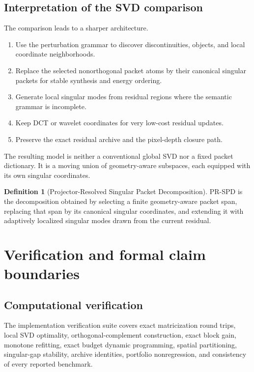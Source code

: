 \documentclass[11pt]{article}
\theoremstyle{definition}
\newtheorem{definition}[theorem]{Definition}
\theoremstyle{remark}
\begin{document}
\subsection{Interpretation of the SVD comparison}
The comparison leads to a sharper architecture.

\begin{enumerate}
\item Use the perturbation grammar to discover discontinuities, objects, and local coordinate neighborhoods.
\item Replace the selected nonorthogonal packet atoms by their canonical singular packets for stable synthesis and energy ordering.
\item Generate local singular modes from residual regions where the semantic grammar is incomplete.
\item Keep DCT or wavelet coordinates for very low-cost residual updates.
\item Preserve the exact residual archive and the pixel-depth closure path.
\end{enumerate}

The resulting model is neither a conventional global SVD nor a fixed packet dictionary. It is a moving union of geometry-aware subspaces, each equipped with its own singular coordinates.

\begin{definition}[Projector-Resolved Singular Packet Decomposition]
PR-SPD is the decomposition obtained by selecting a finite geometry-aware packet span, replacing that span by its canonical singular coordinates, and extending it with adaptively localized singular modes drawn from the current residual.
\end{definition}

\FloatBarrier
\FloatBarrier
\section{Verification and formal claim boundaries}
\subsection{Computational verification}
The implementation verification suite covers exact matricization round trips, local SVD optimality, orthogonal-complement construction, exact block gain, monotone refitting, exact budget dynamic programming, spatial partitioning, singular-gap stability, archive identities, portfolio nonregression, and consistency of every reported benchmark.
\end{document}

